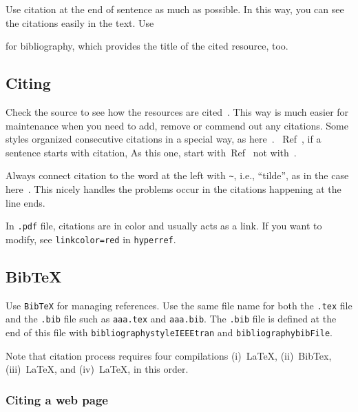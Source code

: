 \documentclass[10pt,journal,compsoc]{IEEEtran}
\newcommand{\refcite}[1]{Ref~\cite{#1}}
\newcommand{\hCode}[1]{\texttt{{\footnotesize #1}}}
\theoremstyle{plain}
\theoremstyle{definition}
\theoremstyle{remark}
\begin{document}
Use citation at  the end of sentence as much as possible.
In this way, 
you can see the citations easily in the text.
Use 
{\footnotesize{\verb!!}
for bibliography,
which provides the title of the cited resource, too. 




\subsection{Citing}

Check the source to see how the resources are cited~\cite{%
	chomsky1993,%
	wikiComplexNetwork}.
This way is much easier for maintenance
when you need to add, remove or commend out any citations.
Some styles organized consecutive citations in a special way,
as here~\cite{%
	feynman1965feynman,
	feynman2018computation,
	feynman2018gravitation,
	feynman1985surely}.
~\refcite{%
	acemoglu2010},
if a sentence starts with citation,
As this one,
start with~\refcite{%
	acemoglu2010}  
not with~\cite{%
	acemoglu2010}.

Always connect citation to the word at the left with \verb!~!, 
i.e., ``tilde'', 
as in the case here~\cite{%
	acemoglu2010}.
This nicely handles the problems occur in the citations happening at the line ends.

In \hCode{.pdf} file, citations are in color and usually acts as a link.
If you want to modify,
see 
\hCode{linkcolor=red}
in 
\hCode{hyperref}.




\subsection{BibTeX}

Use \hCode{BibTeX} for managing references.
Use the same file name for both the \hCode{.tex}  file and the \hCode{.bib} file such as
\hCode{aaa.tex} and \hCode{aaa.bib}.
The \hCode{.bib} file is defined at the end of this file with
\hCode{bibliographystyle{IEEEtran}} and
\hCode{bibliography{bibFile}}.

Note that citation process requires four compilations 
(i)~LaTeX, 
(ii)~BibTex, 
(iii)~LaTeX, and  
(iv)~LaTeX,
in this order.




\subsubsection{Citing a web page}

}
\end{document}
